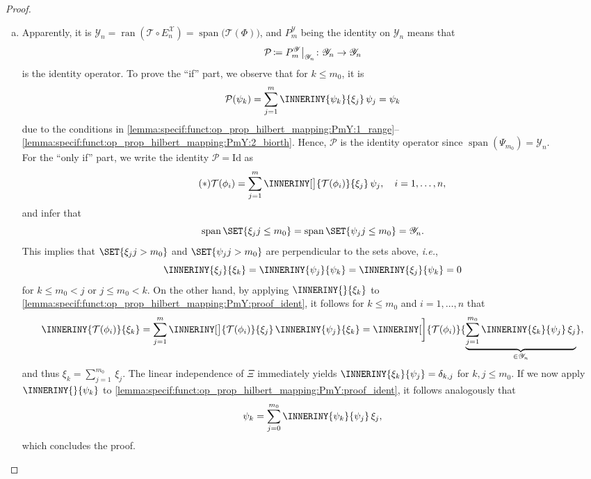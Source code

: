 \documentclass[a4paper]{paper}
\newcommand*{\SPC}[1]{{\ensuremath{\mathscr{#1}}}}
\newcommand*{\SPCY}{\SPC{Y}}
\newcommand*{\OP}[1]{{\ensuremath{\mathcal{#1}}}}
\newcommand*{\OPP}{\OP{P}}
\newcommand*{\OPT}{\OP{T}}
\newcommand*{\OPID}{\OP{\mathrm{Id}}}
\newcommand*{\EXT}[2]{\ensuremath{E_{#1}^{#2}}}
\newcommand*{\PROJ}[2]{\ensuremath{P_{#1}^{#2}}}
\newcommand*{\EnX}{{\ensuremath{\EXT{n}{\SPC{X}}}}}
\newcommand*{\PmY}{{\ensuremath{\PROJ{m}{\SPCY}}}}
\providecommand\GIVEN{}  %
\DeclareMathOperator{\RANGE}{{ran}}
\DeclareMathOperator{\SPAN}{{span}}
\DeclareMathOperator{\DEFEQ}{{\coloneqq}}
\newcommand*{\FUNCRESTR}[2]{{\ensuremath{\left. \vphantom{g_{g_g}} {#1} \right|_{#2}}}}
\newcommand*{\ie}{\textsl{i.e.}\xspace}
\begin{document}
\begin{proof}~
 \begin{enumerate}[(a)]
  \item Apparently, it is $\SPCY_n = \RANGE(\OPT \circ \EnX) = \SPAN\big( \OPT(\Phi) \big)$, and $\PmY$ being the 
  identity on $\SPCY_n$ means that
  \begin{equation*}
   \OPP \DEFEQ \FUNCRESTR{\PmY}{\SPCY_n} \colon \SPCY_n \to \SPCY_n
  \end{equation*}
  is the identity operator. To prove the ``if'' part, we observe that for $k\leq m_0$, it is
  \begin{equation*}
   \OPP(\psi_k) = \sum_{j=1}^m \INNERINY{\psi_k}{\xi_j}\, \psi_j = \psi_k
  \end{equation*}
  due to the conditions in 
  \eqref{lemma:specif:funct:op_prop_hilbert_mapping:PmY:1_range}--%
  \eqref{lemma:specif:funct:op_prop_hilbert_mapping:PmY:2_biorth}.
  Hence, $\OPP$ is the identity operator since $\SPAN(\Psi_{m_0}) = \SPCY_n$. \\
  For the ``only if'' part, we write the identity $\OPP = \OPID$ as
  \begin{equation}
   \label{lemma:specif:funct:op_prop_hilbert_mapping:PmY:proof_ident}
   \tag{{$\ast$}}
   \OPT(\phi_i) 
   = \sum_{j=1}^m \INNERINY[\big]{\OPT(\phi_i)}{\xi_j}\, \psi_j, \quad i=1,\dots,n,
  \end{equation}
  and infer that
  \begin{equation*}
   \SPAN\SET{ \xi_j \GIVEN j\leq m_0 } = \SPAN\SET{ \psi_j \GIVEN j\leq m_0 } = \SPCY_n.
  \end{equation*}
  This implies that $\SET{ \xi_j \GIVEN j > m_0 }$ and $\SET{ \psi_j \GIVEN j > m_0 }$ are perpendicular 
to the sets 
  above, \ie,
  \begin{equation*}
   \INNERINY{\xi_j}{\xi_k} = \INNERINY{\psi_j}{\psi_k} = 
\INNERINY{\xi_j}{\psi_k} = 0
  \end{equation*}
  for $k \leq m_0 < j$ or $j \leq m_0 < k$. On the other hand, by applying $\INNERINY{}{\xi_k}$ to 
  \eqref{lemma:specif:funct:op_prop_hilbert_mapping:PmY:proof_ident}, it follows for $k \leq m_0$ and $i=1,\dots,n$ 
  that
  \begin{equation*}
   \INNERINY{\OPT(\phi_i)}{\xi_k}
   = \sum_{j=1}^m \INNERINY[\big]{\OPT(\phi_i)}{\xi_j}\, \INNERINY{\psi_j}{\xi_k}
   = \INNERINY[\bigg]{\OPT(\phi_i)}{\underbrace{\sum_{j=1}^{m_0} \INNERINY{\xi_k}{\psi_j}\, 
\xi_j}_{\in \SPCY_n}},
  \end{equation*}
  and thus $\xi_k = \sum_{j=1}^{m_0} \, \xi_j$. The linear independence of $\Xi$ 
  immediately yields $\INNERINY{\xi_k}{\psi_j} = \delta_{k,j}$ for $k,j \leq m_0$. If we now apply
  $\INNERINY{}{\psi_k}$ to \eqref{lemma:specif:funct:op_prop_hilbert_mapping:PmY:proof_ident}, it follows 
analogously 
  that
  \begin{equation*}
   \psi_k = \sum_{j=0}^{m_0} \INNERINY{\psi_k}{\psi_j}\, \xi_j,
  \end{equation*}
  which concludes the proof.
  

\end{enumerate}
\end{proof}
\end{document}
